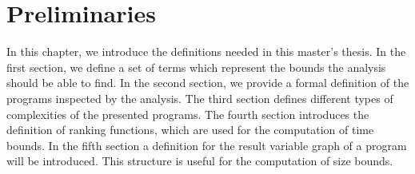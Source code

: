 \section{Preliminaries}

In this chapter, we introduce the definitions needed in this master's thesis.
In the first section, we define a set of terms which represent the bounds the analysis should be able to find. 
In the second section, we provide a formal definition of the programs inspected by the analysis.
The third section defines different types of complexities of the presented programs. 
The fourth section introduces the definition of ranking functions, which are used for the computation of time bounds.
In the fifth section a definition for the result variable graph of a program will be introduced.
This structure is useful for the computation of size bounds.








